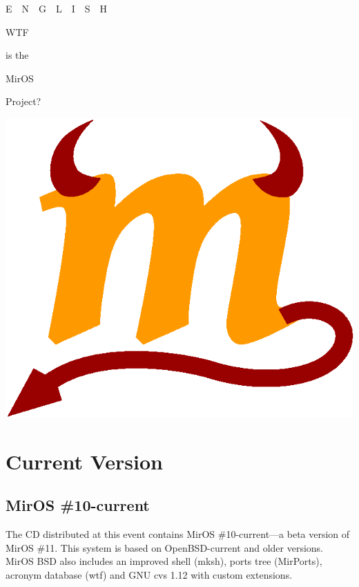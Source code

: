 \documentclass[a4paper,landscape,11pt,notumble]{leaflet}
\begin{document}

\graybox
\begin{center}
{\noindent{}%
\quad E~~N~~G~~L~~I~~S~~H\par}
\vfill

\fontsize{64}{64}\selectfont WTF\par
\fontsize{30}{30}\selectfont is the\par
\fontsize{56}{56}\selectfont MirOS\par
Project?\par

\vfill

\includegraphics[width=0.75\columnwidth]{img/m-color}

\vfill%
\end{center}%
\graybox

\newpage

\section{Current Version}

\subsection{MirOS \#10-current}

The CD distributed at this event contains MirOS \#10-current---a beta version of MirOS \#11. This system is based on OpenBSD-current and older versions. MirOS BSD also includes an improved shell (mksh), ports tree (MirPorts), acronym database (wtf) and GNU cvs 1.12 with custom extensions.
\end{document}
